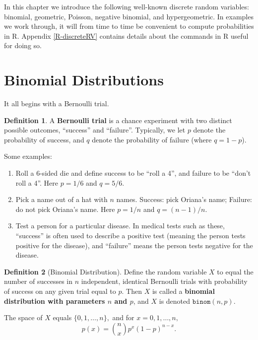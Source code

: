 \documentclass[
]{book}
\providecommand{\tightlist}{%
  \setlength{\itemsep}{0pt}\setlength{\parskip}{0pt}}
\theoremstyle{definition}
\newtheorem{definition}{Definition}[chapter]
\theoremstyle{definition}
\theoremstyle{definition}
\theoremstyle{definition}
\theoremstyle{remark}
\begin{document}
In this chapter we introduce the following well-known discrete random variables:
binomial, geometric, Poisson, negative binomial, and hypergeometric.
In examples we work through, it will from time to time be convenient to compute probabilities in R. Appendix \ref{R-discreteRV} contains details about the commands in R useful for doing so.

\section{Binomial Distributions}\label{binomial}

It all begins with a Bernoulli trial.

\begin{definition}
\protect\hypertarget{def:bernoulli-trial}{}\label{def:bernoulli-trial}A \textbf{Bernoulli trial} is a chance experiment with two distinct possible outcomes, ``success'' and ``failure''. Typically, we let \(p\) denote the probability of success, and \(q\) denote the probability of failure (where \(q = 1 - p\)).
\end{definition}

Some examples:

\begin{enumerate}
\def\labelenumi{\arabic{enumi}.}
\tightlist
\item
  Roll a 6-sided die and define success to be ``roll a 4'', and failure to be ``don't roll a 4''. Here \(p = 1/6\) and \(q = 5/6\).
\item
  Pick a name out of a hat with \(n\) names. Success: pick Oriana's name; Failure: do not pick Oriana's name. Here \(p = 1/n\) and \(q = (n-1)/n\).
\item
  Test a person for a particular disease. In medical tests such as these, ``success'' is often used to describe a positive test (meaning the person tests positive for the disease), and ``failure'' means the person tests negative for the disease.
\end{enumerate}

\begin{definition}[Binomial Distribution]
\protect\hypertarget{def:binomial-distribution}{}\label{def:binomial-distribution}Define the random variable \(X\) to equal the number of successes in \(n\) independent, identical Bernoulli trials with probability of success on any given trial equal to \(p\). Then \(X\) is called a \textbf{binomial distribution with parameters \(n\) and \(p\)}, and \(X\) is denoted \(\texttt{binom}(n,p)\).

The space of \(X\) equals \(\{0,1,\ldots,n\},\) and for \(x = 0,1, \ldots, n,\)
\[p(x) = \binom{n}{x}p^x(1-p)^{n-x}.\]
\end{definition}
\end{document}
